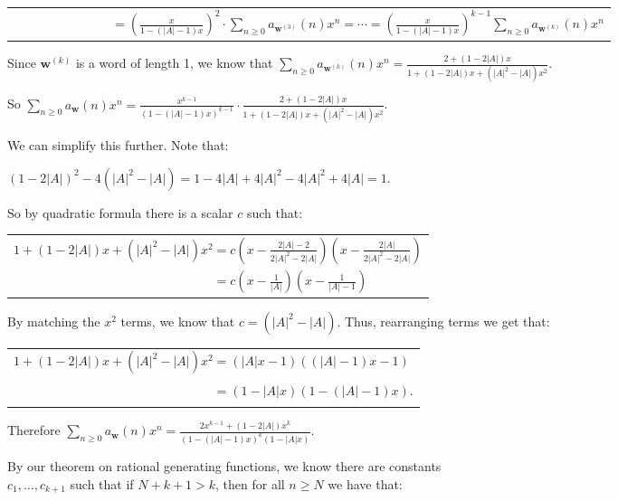 \documentclass{book}
\newenvironment{myIndent}{%
   \begin{adjustwidth}{2.5em}{0em}%
}{%
   \end{adjustwidth}%
}
\newcommand{\retTwo}{\hfill\bigbreak}
\begin{document}
\begin{myIndent}
{\begin{tabular}{l}
      $\phantom{\sum\limits_{n \geq 0}a_{\bm{w}}(n)x^n} = \left(\frac{x}{1 - (|A| - 1)x}\right)^2 \cdot \sum\limits_{n \geq 0}a_{\bm{w}^{(3)}}(n)x^n = \cdots = \left(\frac{x}{1 - (|A| - 1)x}\right)^{k-1} \sum\limits_{n \geq 0}a_{\bm{w}^{(k)}}(n)x^n$
   \end{tabular}\retTwo\par}

   Since $\bm{w}^{(k)}$ is a word of length 1, we know that $\sum\limits_{n \geq 0}a_{\bm{w}^{(k)}}(n)x^n = \frac{2 + (1 - 2|A|)x}{1 + (1 - 2|A|)x+ (|A|^2 - |A|)x^2}$.\retTwo

   So $\sum\limits_{n \geq 0}a_{\bm{w}}(n)x^n = \frac{x^{k-1}}{(1 - (|A| - 1)x)^{k-1}} \cdot \frac{2 + (1 - 2|A|)x}{1 + (1 - 2|A|)x+ (|A|^2 - |A|)x^2}$.\retTwo

   We can simplify this further. Note that:
   
   {\centering $(1 - 2|A|)^2 - 4(|A|^2 - |A|) = 1 - 4|A| + 4|A|^2 - 4|A|^2 + 4|A| = 1$.\retTwo\par}

   So by quadratic formula there is a scalar $c$ such that:
   
   {\centering 
   \begin{tabular}{l}
      $1 + (1 - 2|A|)x+ (|A|^2 - |A|)x^2 = c(x - \frac{2|A| - 2}{2|A|^2 - 2|A|})(x - \frac{2|A|}{2|A|^2 - 2|A|})$\\ [8pt]
      $\phantom{1 + (1 - 2|A|)x+ (|A|^2 - |A|)x^2} = c(x - \frac{1}{|A|})(x - \frac{1}{|A| - 1})$
   \end{tabular}\retTwo\par}

   By matching the $x^2$ terms, we know that $c = (|A|^2 - |A|)$. Thus, rearranging terms we get that:

   {\centering 
   \begin{tabular}{l}
      $1 + (1 - 2|A|)x+ (|A|^2 - |A|)x^2 = (|A|x - 1)((|A| - 1)x - 1)$\\
      $\phantom{1 + (1 - 2|A|)x+ (|A|^2 - |A|)x^2} = (1 - |A|x)(1 - (|A| - 1)x)$.
   \end{tabular} \retTwo\par}

   Therefore $\sum\limits_{n \geq 0}a_{\bm{w}}(n)x^n = \frac{2x^{k-1} + (1 - 2|A|)x^k}{(1 - (|A| - 1)x)^k(1 - |A|x)}$.\retTwo

   By our theorem on rational generating functions, we know there are constants\\ $c_1, \ldots, c_{k+1}$ such that if $N + k + 1 > k$, then for all $n \geq N$ we have that:


\end{myIndent}
\end{document}
